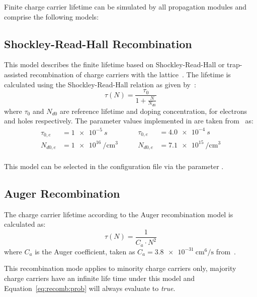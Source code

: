 Finite charge carrier lifetime can be simulated by all propagation modules and comprise the following models:

\subsection{Shockley-Read-Hall Recombination}

This model describes the finite lifetime based on Shockley-Read-Hall or trap-assisted recombination of charge carriers with the lattice~\cite{shockley-read,hall}.
The lifetime is calculated using the Shockley-Read-Hall relation as given by~\cite{fossum-lee}:
\begin{equation}
    \tau(N) = \frac{\tau_0}{1 + \frac{N}{N_{d0}}}
\end{equation}
where $\tau_0$ and $N_{d0}$ are reference lifetime and doping concentration, for electrons and holes respectively.
The parameter values implemented in \apsq are taken from~\cite{fossum} as:
\begin{equation*}
    \begin{split}
        \tau_{0,e} &= \SI{1e-5}{s} \\
        N_{d0,e}   &= \SI{1e16}{\per \cubic \cm} \\
    \end{split}
    \qquad
    \begin{split}
        \tau_{0,e} &= \SI{4.0e-4}{s} \\
        N_{d0,e}   &= \SI{7.1e15}{\per \cubic \cm} \\
    \end{split}
\end{equation*}

This model can be selected in the configuration file via the parameter .

\subsection{Auger Recombination}

The charge carrier lifetime according to the Auger recombination model is calculated as:
\begin{equation}
    \tau(N) = \frac{1}{C_{a} \cdot N^2}
\end{equation}
where $C_{a}$ is the Auger coefficient, taken as $C_{a} = \SI{3.8e-31}{\cm^6 \per \s}$ from~\cite{dziewior}.

This recombination mode applies to minority charge carriers only, majority charge carriers have an infinite life time under this model and Equation~\eqref{eq:recomb:prob} will always evaluate to \emph{true}.

